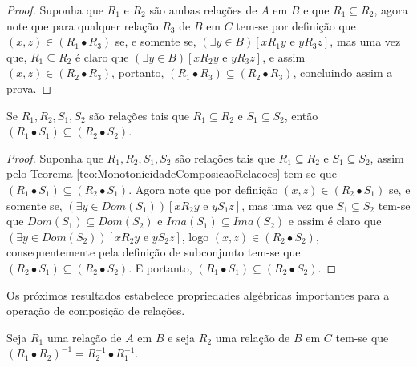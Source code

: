 \begin{proof}
	Suponha que $R_1$ e $R_2$ são ambas relações de $A$ em $B$ e que $R_1 \subseteq R_2$, agora note que para qualquer relação $R_3$ de $B$ em $C$ tem-se por definição que $(x, z) \in (R_1 \bullet R_3)$ se, e somente se, $(\exists y \in B)[x\mathrel{R_1}y \text{ e } y\mathrel{R_3}z]$, mas uma vez que, $R_1 \subseteq R_2$ é claro que $ (\exists y \in B)[x \mathrel{R_2}y \text{ e } y\mathrel{R_3}z]$, e assim $(x, z) \in (R_2 \bullet R_3)$, portanto, $(R_1 \bullet R_3) \subseteq (R_2 \bullet R_3)$, concluindo assim a prova.
\end{proof}

\begin{corollary}\label{col:MonotonicidadeComposicaoRelacoes}
	Se $R_1, R_2, S_1, S_2$ são relações tais que $R_1 \subseteq R_2$ e $S_1 \subseteq S_2$, então $(R_1 \bullet S_1) \subseteq (R_2 \bullet S_2)$.
\end{corollary}

\begin{proof}
	Suponha que $R_1, R_2, S_1, S_2$ são relações tais que $R_1 \subseteq R_2$ e $S_1 \subseteq S_2$, assim pelo Teorema \ref{teo:MonotonicidadeComposicaoRelacoes} tem-se que $(R_1 \bullet S_1) \subseteq (R_2 \bullet S_1)$. Agora note que por definição $(x, z) \in (R_2 \bullet S_1)$ se, e somente se, $(\exists y \in Dom(S_1))[x\mathrel{R_2}y \text{ e } y\mathrel{S_1}z]$, mas uma vez que $S_1 \subseteq S_2$ tem-se que $Dom(S_1) \subseteq Dom(S_2)$ e $Ima(S_1) \subseteq Ima(S_2)$ e assim é claro que $(\exists y \in Dom(S_2))[x\mathrel{R_2}y \text{ e } y\mathrel{S_2}z]$, logo $(x, z) \in (R_2 \bullet S_2)$, consequentemente pela definição de subconjunto tem-se que $(R_2 \bullet S_1) \subseteq (R_2 \bullet S_2)$. E portanto, $(R_1 \bullet S_1) \subseteq (R_2 \bullet S_2)$.
\end{proof}

Os próximos resultados estabelece propriedades algébricas importantes para a operação de composição de relações.

\begin{theorem}\label{teo:PseudoMorganRelacoes}
	Seja $R_1$ uma relação de $A$ em $B$ e seja $R_2$ uma relação de $B$ em $C$ tem-se que $(R_1 \bullet R_2)^{-1} = R_2^{-1} \bullet R_1^{-1}$.
\end{theorem}

